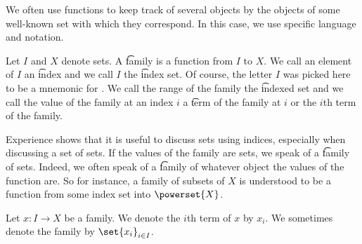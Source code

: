 

We often use functions to keep track of several objects by the objects of some well-known set with which they correspond.
In this case, we use specific language and notation.



Let $I$ and $X$ denote sets.
A \t{family} is a function from $I$ to $X$.
We call an element of $I$ an \t{index} and we call $I$ the \t{index set}.
Of course, the letter $I$ was picked here to be a mnemonic for .
We call the range of the family the \t{indexed set} and we call the value of the family at an index $i$ a \t{term} of the family at $i$ or the \t{$i$th term} of the family.

Experience shows that it is useful to discuss sets using indices, especially when discussing a set of sets.
If the values of the family are sets, we speak of a \t{family of sets}.
Indeed, we often speak of a \t{family of} whatever object the values of the function are.
So for instance, a family of subsets of $X$ is understood to be a function from some index set into $\powerset{X}$.



Let $x: I \to X$ be a family.
We denote the $i$th term of $x$ by $x_i$.
We sometimes denote the family by $\set{x_i}_{i \in I}$.

\blankpage


